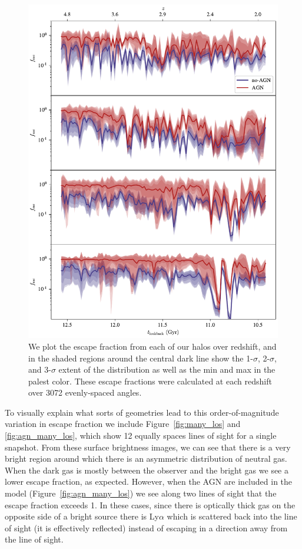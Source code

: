 \begin{figure}
    \centering
    \includegraphics[width=\textwidth,height=\textheight,keepaspectratio]{figures/agn_los.pdf}
    \caption{
         We plot the escape fraction from each of our halos over redshift, and in the shaded regions around the central dark line show the 1-$\sigma$, 2-$\sigma$, and 3-$\sigma$ extent of the distribution as well as the min and max in the palest color.
        These escape fractions were calculated at each redshift over 3072 evenly-spaced angles.
    }
    \label{fig:agn_los}
\end{figure}

To visually explain what sorts of geometries lead to this order-of-magnitude variation in escape fraction we include Figure~\ref{fig:many_los} and \ref{fig:agn_many_los}, which show 12 equally spaces lines of sight for a single snapshot.
From these surface brightness images, we can see that there is a very bright region around which there is an asymmetric distribution of neutral gas.
When the dark gas is mostly between the observer and the bright gas we see a lower escape fraction, as expected.
However, when the AGN are included in the model (Figure~\ref{fig:agn_many_los}) we see along two lines of sight that the escape fraction exceeds 1.
In these cases, since there is optically thick gas on the opposite side of a bright source there is Ly$\alpha$ which is scattered back into the line of sight (it is effectively reflected) instead of escaping in a direction away from the line of sight.

